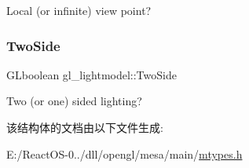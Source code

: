 Local (or infinite) view point? \mbox{\label{structgl__lightmodel_adf9fd2d4f67193ff77cf7812a4c33903}} 
\subsubsection{\texorpdfstring{Two\+Side}{TwoSide}}
{\footnotesize\ttfamily G\+Lboolean gl\+\_\+lightmodel\+::\+Two\+Side}

Two (or one) sided lighting? 

该结构体的文档由以下文件生成\+:\begin{DoxyCompactItemize}
\item 
E\+:/\+React\+O\+S-\/0../dll/opengl/mesa/main/\hyperlink{mtypes_8h}{mtypes.\+h}\end{DoxyCompactItemize}
